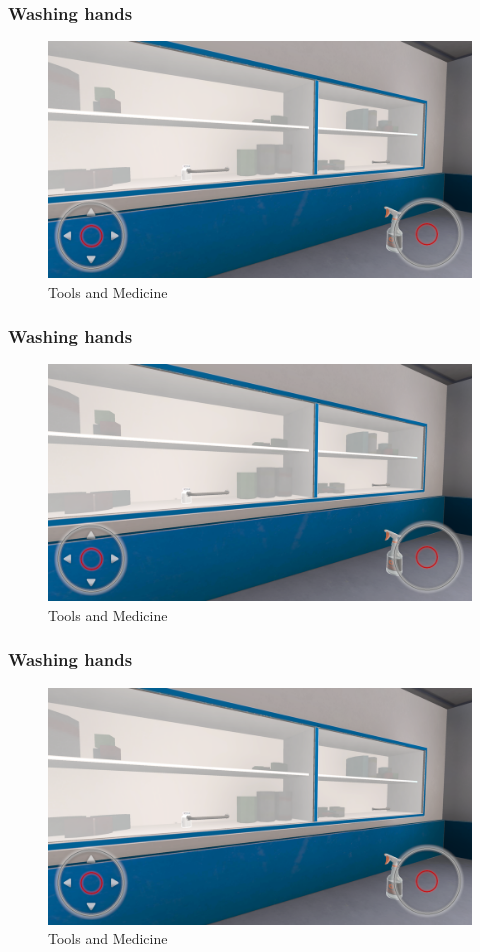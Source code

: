\subsubsection{Washing hands}
\begin{figure}[h]
	\centering
	\includegraphics[width=0.65\linewidth]{Images/Tools and Medicine.png}
	\caption{Tools and Medicine}
	\label{fig:system-diagram}
\end{figure}

\subsubsection{Washing hands}
\begin{figure}[h]
	\centering
	\includegraphics[width=0.65\linewidth]{Images/Tools and Medicine.png}
	\caption{Tools and Medicine}
	\label{fig:system-diagram}
\end{figure}

\subsubsection{Washing hands}
\begin{figure}[h]
	\centering
	\includegraphics[width=0.65\linewidth]{Images/Tools and Medicine.png}
	\caption{Tools and Medicine}
	\label{fig:system-diagram}
\end{figure}

